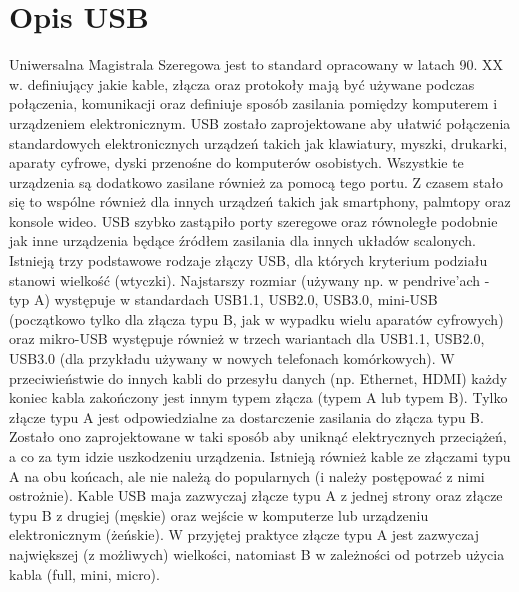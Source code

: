 \documentclass{BscUS}
\begin{document}
\section{Opis USB}
\label{USBStandardChapter}
Uniwersalna Magistrala Szeregowa jest to standard opracowany w latach 90. XX w. definiujący jakie kable, złącza oraz protokoły mają być używane podczas połączenia, komunikacji oraz definiuje sposób zasilania pomiędzy komputerem i urządzeniem elektronicznym. USB zostało zaprojektowane aby ułatwić połączenia standardowych elektronicznych urządzeń takich jak klawiatury, myszki, drukarki, aparaty cyfrowe, dyski przenośne do komputerów osobistych. Wszystkie te urządzenia są dodatkowo zasilane również za pomocą tego portu. Z czasem stało się to wspólne również dla innych urządzeń takich jak smartphony, palmtopy oraz konsole wideo.\cite{USBSystemArch, USB20Doc, USB30Doc}
\newline
\indent USB szybko zastąpiło porty szeregowe oraz równoległe podobnie jak inne urządzenia będące źródłem zasilania dla innych układów scalonych. Istnieją trzy podstawowe rodzaje złączy USB, dla których kryterium podziału stanowi wielkość (wtyczki). Najstarszy rozmiar (używany np. w pendrive'ach - typ A) występuje w standardach USB1.1, USB2.0, USB3.0, mini-USB (początkowo tylko dla złącza typu B, jak w wypadku wielu aparatów cyfrowych) oraz mikro-USB występuje również w trzech wariantach dla USB1.1, USB2.0, USB3.0 (dla przykładu używany w nowych telefonach komórkowych). 
\newline
\indent W przeciwieństwie do innych kabli do przesyłu danych (np. Ethernet, HDMI) każdy koniec kabla zakończony jest innym typem złącza (typem A lub typem B). Tylko złącze typu A jest odpowiedzialne za dostarczenie zasilania do złącza typu B. Zostało ono zaprojektowane w taki sposób aby uniknąć elektrycznych przeciążeń, a co za tym idzie uszkodzeniu urządzenia. Istnieją również kable ze złączami typu A na obu końcach, ale nie należą do popularnych (i należy postępować z nimi ostrożnie). Kable USB maja zazwyczaj złącze typu A z jednej strony oraz złącze typu B z drugiej (męskie) oraz wejście w komputerze lub urządzeniu elektronicznym (żeńskie). W przyjętej praktyce złącze typu A jest zazwyczaj największej (z możliwych) wielkości, natomiast B w zależności od potrzeb użycia kabla (full, mini, micro). \cite{USBSystemArch, USB20Doc, USB30Doc}
\end{document}
